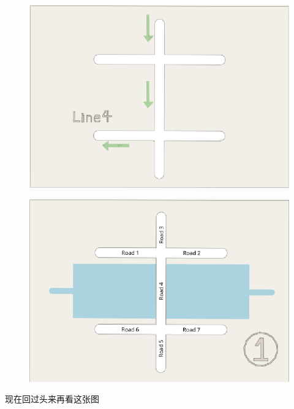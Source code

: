 \documentclass{beamer}
\begin{document}
\begin{frame}
    \begin{figure}[htpb]
        \centering
        \includegraphics[width=1\linewidth]{figure/line4.png}
    \end{figure}
\end{frame}

\begin{frame}
    \begin{figure}[htpb]
        \centering
        \includegraphics[width=0.95\linewidth]{figure/plot1.png}
    \end{figure}
    {
        \centering
        \quad \quad \quad \quad 现在回过头来再看这张图
    }
\end{frame}
\end{document}
